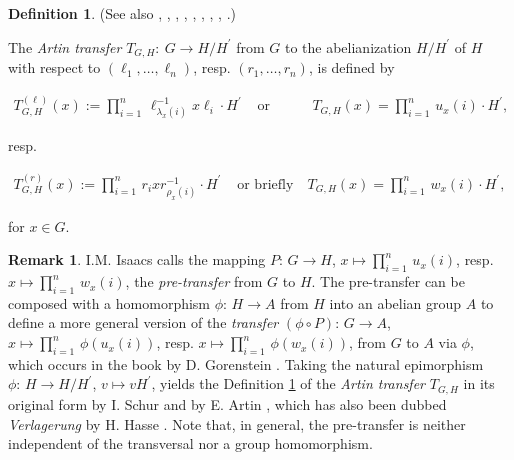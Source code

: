 \documentclass{amsart}
\theoremstyle{definition}
\newtheorem{definition}{Definition}[section]
\newtheorem{remark}{Remark}[section]
\numberwithin{equation}{section}
\begin{document}
\begin{definition}
\label{dfn:ArtinTransfer}
(See also
\cite[p.1014]{Su},
\cite[\S 2, p.50]{Ar2},
\cite[(14.2.2--4), p.202]{Hl},
\cite[p.413]{Hp},
\cite[p.248]{Gs},
\cite[p.197]{Ab},
\cite[Dfn.(17.1), p.60]{DkHw},
\cite[p.154]{SmTb}
\cite[p.149]{Is},
\cite[p.2]{Ol}.)

The \textit{Artin transfer} \(T_{G,H}:\ G\to H/H^\prime\) from \(G\) to the abelianization \(H/H^\prime\) of \(H\)
with respect to \((\ell_1,\ldots,\ell_n)\), resp. \((r_1,\ldots,r_n)\), is defined by

\begin{equation}
\label{eqn:LeftTransfer}
\begin{array}{ccc}
T_{G,H}^{(\ell)}(x):=\prod_{i=1}^n\,\ell_{\lambda_x(i)}^{-1}x\ell_i\cdot H^\prime & \text{ or briefly } & T_{G,H}(x)=\prod_{i=1}^n\,u_x(i)\cdot H^\prime,
\end{array}
\end{equation}

\noindent
resp.

\begin{equation}
\label{eqn:RightTransfer}
\begin{array}{ccc}
T_{G,H}^{(r)}(x):=\prod_{i=1}^n\,r_ixr_{\rho_x(i)}^{-1}\cdot H^\prime & \text{ or briefly } & T_{G,H}(x)=\prod_{i=1}^n\,w_x(i)\cdot H^\prime,
\end{array}
\end{equation}

\noindent
for \(x\in G\).

\end{definition}



\begin{remark}
\label{rmk:Transfer}
I.M. Isaacs
\cite[p.149]{Is}
calls the mapping \(P:\,G\to H\),
\(x\mapsto\prod_{i=1}^n\,u_x(i)\), resp. \(x\mapsto\prod_{i=1}^n\,w_x(i)\),
the \textit{pre-transfer} from \(G\) to \(H\).
The pre-transfer can be composed with
a homomorphism \(\phi:\,H\to A\) from \(H\) into an abelian group \(A\)
to define a more general version of the \textit{transfer} \((\phi\circ P):\,G\to A\),
\(x\mapsto\prod_{i=1}^n\,\phi(u_x(i))\), resp. \(x\mapsto\prod_{i=1}^n\,\phi(w_x(i))\),
from \(G\) to \(A\) via \(\phi\), which occurs in the book by D. Gorenstein
\cite[p.248]{Gs}.
Taking the natural epimorphism \(\phi:\,H\to H/H^\prime\), \(v\mapsto vH^\prime\),
yields the Definition
\ref{dfn:ArtinTransfer}
of the \textit{Artin transfer} \(T_{G,H}\) in its original form by I. Schur
\cite[p.1014]{Su}
and by E. Artin
\cite[\S 2, p.50]{Ar2},
which has also been dubbed \textit{Verlagerung} by H. Hasse
\cite[\S 27.4, pp.170--171]{Ha}.
Note that, in general, the pre-transfer is
neither independent of the transversal nor a group homomorphism.
\end{remark}
\end{document}
